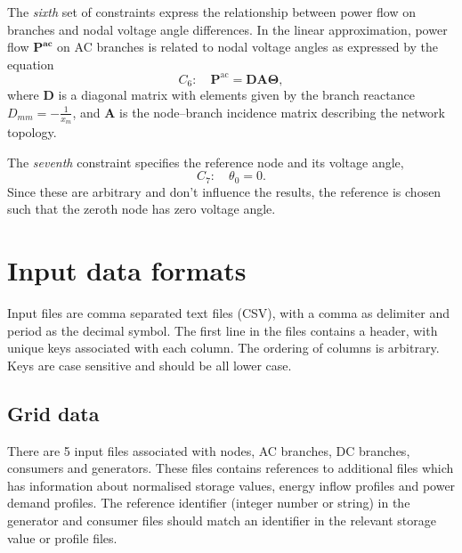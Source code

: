 \documentclass{article}
\begin{document}
The \emph{sixth} set of constraints express the relationship between power flow on branches and nodal voltage angle differences.
In the linear approximation, power flow $\mathbf{P^\text{ac}}$ on AC branches is related to nodal voltage angles as expressed by the equation
\begin{equation}
	C_6:\quad \mathbf{P}^\text{ac} = \mathbf{D A \Theta},
\end{equation}
where $\mathbf{D}$ is a diagonal matrix with elements given by the branch reactance $D_{mm} =-\frac{1}{x_m}$,  and $\mathbf{A}$ is the node--branch incidence matrix describing the network topology.



The \emph{seventh} constraint specifies the reference node and its voltage angle,
\begin{equation}
	C_7:\quad 
	\theta_0 = 0.
\end{equation}
Since these are arbitrary and don't influence the results, the reference is chosen such that the zeroth node has zero voltage angle.



\section{Input data formats}
Input files are comma separated text files (CSV), with a comma as delimiter and period as the decimal symbol. The first line in the files contains a header, with unique keys associated with each column. The ordering of columns is arbitrary. Keys are case sensitive and should be all lower case.

\subsection{Grid data}
There are 5 input files associated with nodes, AC branches, DC branches, consumers and generators. These files contains references to additional files which has information about normalised storage values, energy inflow profiles and power demand profiles. The reference identifier (integer number or string) in the generator and consumer files should match an identifier in the relevant storage value or profile files.
\end{document}
